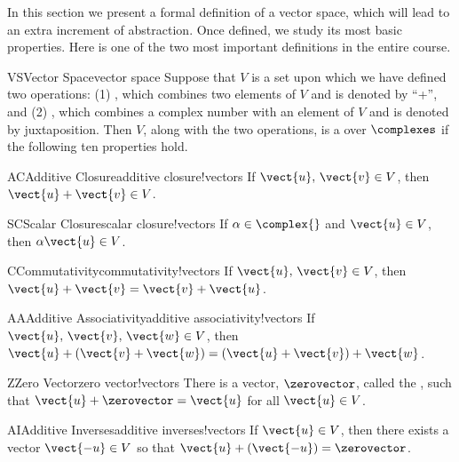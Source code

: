 %
In this section we present a formal definition of a vector space, which will lead to an extra increment of abstraction.  Once defined, we study its most basic properties.
%
%
Here is one of the two most important definitions in the entire course.
%
\begin{definition}{VS}{Vector Space}{vector space}
%
Suppose that $V$ is a set upon which we have defined two operations: (1) , which combines two elements of $V$ and is denoted by ``+'', and (2) , which combines a complex number with an element of $V$ and is denoted by juxtaposition.   Then $V$, along with the two operations, is a  over $\complexes$ if the following ten properties hold.
%
\begin{propertylist}
%
\begin{property}{AC}{Additive Closure}{additive closure!vectors}
If $\vect{u},\,\vect{v}\in V$, then $\vect{u}+\vect{v}\in V$.\end{property}
%
\begin{property}{SC}{Scalar Closure}{scalar closure!vectors}
If $\alpha\in\complex{\null}$ and $\vect{u}\in V$, then $\alpha\vect{u}\in V$.\end{property}
%
\begin{property}{C}{Commutativity}{commutativity!vectors}
If $\vect{u},\,\vect{v}\in V$, then $\vect{u}+\vect{v}=\vect{v}+\vect{u}$.\end{property}
%
\begin{property}{AA}{Additive Associativity}{additive associativity!vectors}
If $\vect{u},\,\vect{v},\,\vect{w}\in V$, then $\vect{u}+\left(\vect{v}+\vect{w}\right)=\left(\vect{u}+\vect{v}\right)+\vect{w}$.\end{property}
%
\begin{property}{Z}{Zero Vector}{zero vector!vectors}
There is a vector, $\zerovector$, called the , such that  $\vect{u}+\zerovector=\vect{u}$  for all $\vect{u}\in V$.\end{property}
%
\begin{property}{AI}{Additive Inverses}{additive inverses!vectors}
If $\vect{u}\in V$, then there exists a vector $\vect{-u}\in V$ so that $\vect{u}+ (\vect{-u})=\zerovector$.\end{property}

\end{propertylist}
\end{definition}
